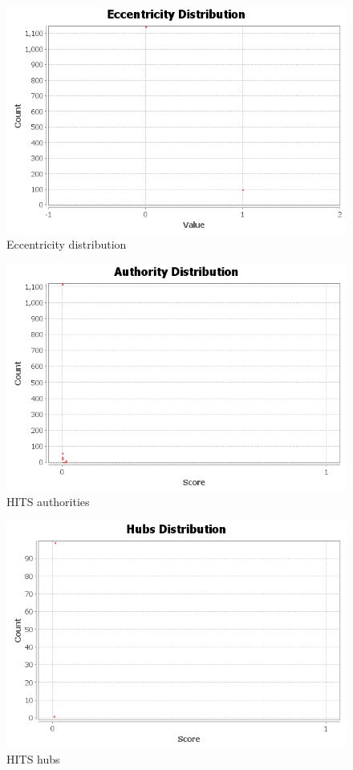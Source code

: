 \documentclass{article}
\begin{document}
\begin{figure}
  \centering
  \caption{Eccentricity distribution}
  \includegraphics[scale=.5]{EccentricityDistribution.png}
\end{figure}
\graphicspath{{q3/hits/}}
\begin{figure}
  \centering
  \caption{HITS authorities}
  \includegraphics[scale=.5]{authorities.png}
\end{figure}
\begin{figure}
  \centering
  \caption{HITS hubs}
  \includegraphics[scale=.5]{hubs.png}
\end{figure}
\end{document}
